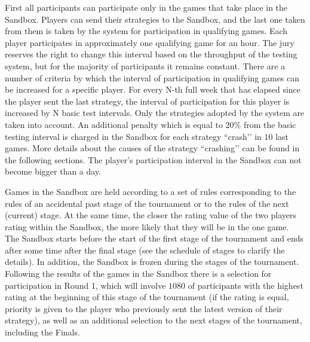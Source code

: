 First all participants can participate only in the games that take place in the Sandbox. Players can send their strategies to the Sandbox, and
the last one taken from them is taken by the system for participation in qualifying games. Each player participates in approximately one qualifying
game for an hour. The jury reserves the right to change this interval based on the throughput of the testing system, but for
the majority of participants it remains constant. There are a number of criteria by which the interval of participation in qualifying games
can be increased for a specific player. For every N-th full week that has elapsed since the player sent the last strategy, the interval
of participation for this player is increased by N basic test intervals. Only the strategies adopted by the system are taken into account. An additional penalty which is equal to $20\%$ from the basic testing interval is charged in the Sandbox for each strategy ``crash’’ in $10$ last games.
More details about the causes of the strategy ``crashing’’ can be found in the following sections. The player’s participation interval in the Sandbox can not become bigger than a day.

Games in the Sandbox are held according to a set of rules corresponding to the rules of an accidental past stage of the tournament or to the rules of the next
(current) stage. At the same time, the closer the rating value of the two players rating within the Sandbox, the more likely that they will be in the
one game. The Sandbox starts before the start of the first stage of the tournament and ends after some time after the final stage (see the schedule
of stages to clarify the details). In addition, the Sandbox is frozen during the stages of the tournament. Following the results of the games in the Sandbox
there is a selection for participation in Round 1, which will involve $1080$ of participants with the highest rating at the beginning of this stage of the tournament
(if the rating is equal, priority is given to the player who previously sent the latest version of their strategy), as well as an additional selection to
the next stages of the tournament, including the Finals.

